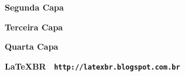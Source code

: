 \documentclass[11pt,a4paper]{article}
\begin{document}

\begin{flushleft}
  \begin{minipage}{.5\linewidth}
    {\fontsize{50pt}{80pt}\selectfont
      \color{vinho}\textbf{Segunda Capa}
    }

    \vspace*{0.7cm}
    \lipsum[1-2] 
  \end{minipage}
\end{flushleft}

\newpage


\begin{flushright}
  \begin{minipage}{.5\linewidth}
    {\fontsize{50pt}{80pt}\selectfont
      \color{vinho}\textbf{Terceira Capa}
    }

    \vspace*{0.7cm}
    \lipsum[1] 
  \end{minipage}
\end{flushright}


\newpage


\lipsum[1]

\begin{center}
\huge\bfseries\sffamily\color{vinho}Quarta Capa
\end{center}

\lipsum[2]

\vfill

\noindent
\colorbox{vinho}{
	\parbox[t]{1.0\linewidth}{
		\centering
		\vspace*{0.7cm}
		
		\color{orange}\textbf{\LaTeX BR \textbullet\ \texttt{http://latexbr.blogspot.com.br}}\par
		
		\vspace*{0.7cm}
	}
}

\begin{center}
	
\end{center}
\end{document}
